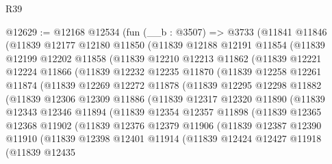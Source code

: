 \begin{lexlean}{R39}
\begin{coremodule}
@12629 := @12168
    @12534
    (fun (__b : @3507) =>
    @3733
      (@11841
        @11846
        (@11839
          @12177
          @12180
          @11850
          (@11839
            @12188
            @12191
            @11854
            (@11839
              @12199
              @12202
              @11858
              (@11839
                @12210
                @12213
                @11862
                (@11839
                  @12221
                  @12224
                  @11866
                  (@11839
                    @12232
                    @12235
                    @11870
                    (@11839
                      @12258
                      @12261
                      @11874
                      (@11839
                        @12269
                        @12272
                        @11878
                        (@11839
                          @12295
                          @12298
                          @11882
                          (@11839
                            @12306
                            @12309
                            @11886
                            (@11839
                              @12317
                              @12320
                              @11890
                              (@11839
                                @12343
                                @12346
                                @11894
                                (@11839
                                  @12354
                                  @12357
                                  @11898
                                  (@11839
                                    @12365
                                    @12368
                                    @11902
                                    (@11839
                                      @12376
                                      @12379
                                      @11906
                                      (@11839
                                        @12387
                                        @12390
                                        @11910
                                        (@11839
                                          @12398
                                          @12401
                                          @11914
                                          (@11839
                                            @12424
                                            @12427
                                            @11918
                                            (@11839
                                              @12435

\end{coremodule}
\end{lexlean}
